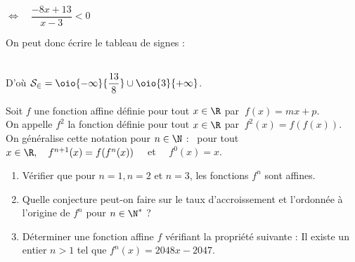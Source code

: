 \documentclass[a4paper,11pt,french]{article}
\begin{document}
\begin{exercicecorrection}
\begin{multicols}{2}
\begin{enumerate}[\bfseries 1.]
\begin{tabbing}
				\>	$\Leftrightarrow\quad	\dfrac{-8x+13}{x-3} <0$
			\end{tabbing}
			On peut donc écrire le tableau de signes :\\[.5em]
				\\[.5em]
			D'où $\mathcal{S_2}=\oio{-\infty}{\dfrac{13}{8}}\cup\oio{3}{+\infty}$.
		\end{enumerate}
	\end{multicols}
	
\end{exercicecorrection}

\newpage
\begin{exercice}
	Soit $f$ une fonction affine définie pour tout $x\in \R$ par $\ f(x)=mx+p$.\\
	On appelle $f^2$ la fonction définie pour tout $x\in\R$ par $\ f^2(x)=f(f(x))$.\\
	On généralise cette notation pour $n\in\N$ : \ pour tout $x\in\R, \quad f^{n+1}(x)=f(f^n(x)) \quad$ et $\quad f^0(x)=x$.
	\begin{enumerate}[\bfseries 1.]
		\item 	Vérifier que pour $n=1, n=2$ et $n=3$, les fonctions $f^n$ sont affines.
		\item 	Quelle conjecture peut-on faire sur le taux d'accroissement et l'ordonnée à l'origine de $f^n$ pour $n\in\N^*$ ?
		\item	Déterminer une fonction affine $f$ vérifiant la propriété suivante : \og Il existe un entier $n>1$ tel que $f^n(x)=2048x-2047$.
	\end{enumerate}
\end{exercice}
\end{document}
